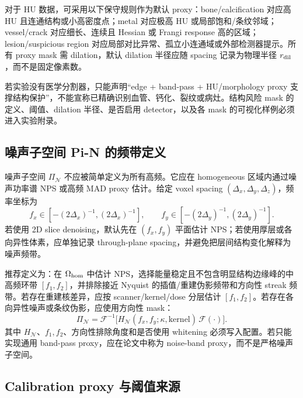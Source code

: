 \documentclass[11pt,a4paper,UTF8,fontset=fandol]{ctexart}
\theoremstyle{definition}
\begin{document}
对于 HU 数据，可采用以下保守规则作为默认 proxy：bone/calcification 对应高 HU 且连通结构或小高密度点；metal 对应极高 HU 或局部饱和/条纹邻域；vessel/crack 对应细长、连续且 Hessian 或 Frangi response 高的区域；lesion/suspicious region 对应局部对比异常、孤立小连通域或外部检测器提示。所有 proxy mask 需 dilation，默认 dilation 半径应随 spacing 记录为物理半径 $r_{\rm dil}$，而不是固定像素数。

若实验没有医学分割器，只能声明“edge + band-pass + HU/morphology proxy 支撑结构保护”，不能宣称已精确识别血管、钙化、裂纹或病灶。结构风险 mask 的定义、阈值、dilation 半径、是否启用 detector，以及各 mask 的可视化样例必须进入实验附录。

\subsection{噪声子空间 Pi-N 的频带定义}
\label{subsec:noise-subspace-frequency-band}

噪声子空间 $\Pi_{\mathcal N}$ 不应被简单定义为所有高频。它应在 homogeneous 区域内通过噪声功率谱 NPS 或高频 MAD proxy 估计。给定 voxel spacing $(\Delta_x,\Delta_y,\Delta_z)$，频率坐标为
\begin{equation}
    f_x\in[-(2\Delta_x)^{-1},(2\Delta_x)^{-1}],
    \qquad
    f_y\in[-(2\Delta_y)^{-1},(2\Delta_y)^{-1}] .
\end{equation}
若使用 2D slice denoising，默认先在 $(f_x,f_y)$ 平面估计 NPS；若使用厚层或各向异性体素，应单独记录 through-plane spacing，并避免把层间结构变化解释为噪声频带。

推荐定义为：在 $\Omega_{\rm hom}$ 中估计 NPS，选择能量稳定且不包含明显结构边缘峰的中高频环带 $[f_1,f_2]$，并排除接近 Nyquist 的插值/重建伪影频带和方向性 streak 频带。若存在重建核差异，应按 scanner/kernel/dose 分层估计 $[f_1,f_2]$。若存在各向异性噪声或条纹伪影，应使用方向性 mask：
\begin{equation}
    \Pi_{\mathcal N}=\mathcal F^{-1}\!\big[H_{\mathcal N}(f_x,f_y;\kappa,\mathrm{kernel})\,\mathcal F(\cdot)\big] .
\end{equation}
其中 $H_{\mathcal N}$、$f_1,f_2$、方向性排除角度和是否使用 whitening 必须写入配置。若只能实现通用 band-pass proxy，应在论文中称为 noise-band proxy，而不是严格噪声子空间。

\subsection{Calibration proxy 与阈值来源}
\label{subsec:calibration-threshold-protocol}
\end{document}
